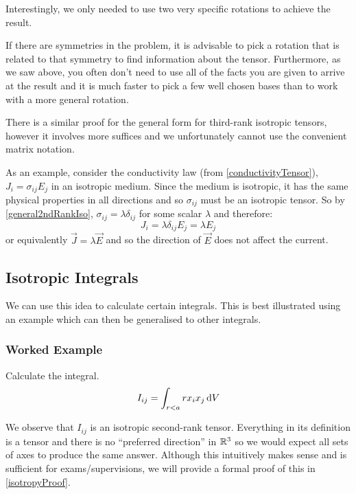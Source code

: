 \documentclass[../main.tex]{subfiles}
\begin{document}
\begin{remark}
  Interestingly, we only needed to use two very specific rotations to achieve the result.

  If there are symmetries in the problem, it is advisable to pick a rotation that is related to that symmetry to find information about the tensor.
  Furthermore, as we saw above, you often don't need to use all of the facts you are given to arrive at the result and it is much faster to pick a few well chosen bases than to work with a more general rotation.
\end{remark}
There is a similar proof for the general form for third-rank isotropic tensors, however it involves more suffices and we unfortunately cannot use the convenient matrix notation.
\begin{remark}
  As an example, consider the conductivity law (from \cref{conductivityTensor}), $J_i = \sigma_{i j}E_j$ in an isotropic medium.
  Since the medium is isotropic, it has the same physical properties in all directions and so $\sigma_{i j}$ must be an isotropic tensor.
  So by \cref{general2ndRankIso}, $\sigma_{i j} = \lambda \delta_{i j}$ for some scalar $\lambda$ and therefore:
  \[
    J_i = \lambda \delta_{i j}E_j = \lambda E_j
  \]
  or equivalently $\vec{J} = \lambda \vec{E}$ and so the direction of $\vec{E}$ does not affect the current.
\end{remark}
\subsection{Isotropic Integrals}
We can use this idea to calculate certain integrals.
This is best illustrated using an example which can then be generalised to other integrals.
\subsubsection{Worked Example}
\begin{remark}[Question]
  Calculate the integral.
  \[
    I_{i j} = \int_{r < a} rx_ix_j \d{V}
  \]
\end{remark}
We observe that $I_{i j}$ is an isotropic second-rank tensor.
Everything in its definition is a tensor and there is no ``preferred direction'' in $\mathbb{R}^3$ so we would expect all sets of axes to produce the same answer.
Although this intuitively makes sense and is sufficient for exams/supervisions, we will provide a formal proof of this in \cref{isotropyProof}.
\end{document}
